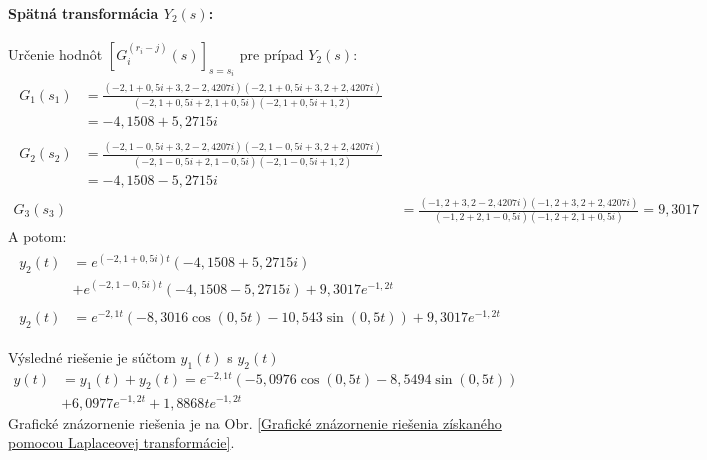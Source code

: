 \documentclass[a4paper, 10pt, ]{article}
\begin{document}
\paragraph{Spätná transformácia $Y_2(s)$:}
Určenie hodnôt $\left[ G_i^{(r_i-j)} (s) \right]_{s = s_i}$ pre prípad $Y_2(s)$:
\begin{subequations}
	\begin{align}
        \begin{split}
		G_1(s_1) &= \frac{\left( -2,1 + 0,5i + 3,2 - 2,4207i \right)\left( -2,1 + 0,5i + 3,2 + 2,4207i \right)}
		                 {\left( -2,1 + 0,5i + 2,1 + 0,5i \right)\left( -2,1 + 0,5i + 1,2 \right) }
		                 \\&= -4,1508 + 5,2715i
        \end{split}\\
        \begin{split}
		G_2(s_2) &= \frac{\left( -2,1 - 0,5i + 3,2 - 2,4207i \right)\left( -2,1 - 0,5i + 3,2 + 2,4207i \right)}
		                 {\left( -2,1 - 0,5i + 2,1 - 0,5i \right)\left( -2,1 - 0,5i + 1,2 \right) }
		                 \\&= -4,1508 - 5,2715i
        \end{split}\\
		G_3(s_3) &= \frac{\left( -1,2 + 3,2 - 2,4207i \right)\left( -1,2 + 3,2 + 2,4207i \right)}
		                 {\left( -1,2 + 2,1 - 0,5i \right)\left( -1,2 + 2,1 + 0,5i \right) }
		                 = 9,3017
	\end{align}
\end{subequations}
A potom:
\begin{subequations}
	\begin{align}
		\begin{split}
			y_2(t) &= e^{(-2,1 + 0,5i)t}\left( -4,1508 + 5,2715i \right) \\&+ e^{(-2,1 - 0,5i)t}\left( -4,1508 - 5,2715i \right) + 9,3017 e^{-1,2t}
		\end{split}	\\
		\begin{split}
			y_2(t) &= e^{-2,1t} \left( -8,3016 \cos(0,5t) -10,543 \sin(0,5t) \right) + 9,3017 e^{-1,2t}
		\end{split}
	\end{align}
\end{subequations}




Výsledné riešenie je súčtom $y_1(t)$ s $y_2(t)$
\begin{equation}
	\begin{split}
		y(t) &= y_1(t) + y_2(t) = e^{-2,1t} \left( -5,0976 \cos(0,5t) -8,5494 \sin(0,5t) \right) \\&+6,0977 e^{-1,2t} + 1,8868te^{-1,2t}
	\end{split}
\end{equation}
Grafické znázornenie riešenia je na Obr. \ref{Grafické znázornenie riešenia získaného pomocou Laplaceovej transformácie}.
\end{document}
